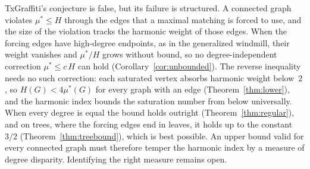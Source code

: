 \documentclass[11pt]{article}
\theoremstyle{definition}
\theoremstyle{remark}
\newcommand{\mustar}{\mu^{*}}
\begin{document}
TxGraffiti's conjecture is false, but its failure is structured.  A connected graph
violates $\mustar \le H$ through the edges that a maximal matching is forced
to use, and the size of the violation tracks the harmonic weight of
those edges.  When the forcing edges have high-degree endpoints, as in the
generalized windmill, their weight vanishes and $\mustar/H$ grows without
bound, so no degree-independent correction $\mustar \le c\,H$ can hold
(Corollary~\ref{cor:unbounded}).  The reverse inequality needs no such
correction: each saturated vertex absorbs harmonic weight below~$2$, so
$H(G) < 4\mustar(G)$ for every graph with an edge (Theorem~\ref{thm:lower}), and the
harmonic index bounds the saturation number from below universally.  When
every degree is equal the bound holds outright
(Theorem~\ref{thm:regular}), and on trees, where the forcing edges end in
leaves, it holds up to the constant~$3/2$
(Theorem~\ref{thm:treebound}), which is best possible.  An upper bound valid
for every connected graph must therefore temper the harmonic index by a
measure of degree disparity.  Identifying the right measure remains open.



\end{document}
